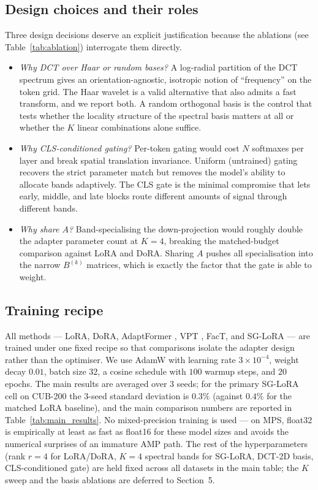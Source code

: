 \documentclass{article}
\begin{document}
\subsection{Design choices and their roles}

Three design decisions deserve an explicit justification because the ablations (see Table~\ref{tab:ablation}) interrogate them directly.

\begin{itemize}
\item \emph{Why DCT over Haar or random bases?} A log-radial partition of the DCT spectrum gives an orientation-agnostic, isotropic notion of ``frequency'' on the token grid. The Haar wavelet is a valid alternative that also admits a fast transform, and we report both. A random orthogonal basis is the control that tests whether the locality structure of the spectral basis matters at all or whether the $K$ linear combinations alone suffice.
\item \emph{Why CLS-conditioned gating?} Per-token gating would cost $N$ softmaxes per layer and break spatial translation invariance. Uniform (untrained) gating recovers the strict parameter match but removes the model's ability to allocate bands adaptively. The CLS gate is the minimal compromise that lets early, middle, and late blocks route different amounts of signal through different bands.
\item \emph{Why share $A$?} Band-specialising the down-projection would roughly double the adapter parameter count at $K=4$, breaking the matched-budget comparison against LoRA and DoRA. Sharing $A$ pushes all specialisation into the narrow $B^{(k)}$ matrices, which is exactly the factor that the gate is able to weight.
\end{itemize}

\subsection{Training recipe}

All methods — LoRA, DoRA, AdaptFormer \citep{chen2022adaptformer}, VPT \citep{jia2022vpt}, FacT, and SG-LoRA — are trained under one fixed recipe so that comparisons isolate the adapter design rather than the optimiser. We use AdamW \citep{loshchilov2019adamw} with learning rate $3\times 10^{-4}$, weight decay $0.01$, batch size $32$, a cosine schedule with $100$ warmup steps, and $20$ epochs. The main results are averaged over $3$ seeds; for the primary SG-LoRA cell on CUB-200 the 3-seed standard deviation is $0.3\%$ (against $0.4\%$ for the matched LoRA baseline), and the main comparison numbers are reported in Table~\ref{tab:main_results}. No mixed-precision training is used — on MPS, float32 is empirically at least as fast as float16 for these model sizes and avoids the numerical surprises of an immature AMP path. The rest of the hyperparameters (rank $r = 4$ for LoRA/DoRA, $K = 4$ spectral bands for SG-LoRA, DCT-2D basis, CLS-conditioned gate) are held fixed across all datasets in the main table; the $K$ sweep and the basis ablations are deferred to Section~5.
\end{document}
